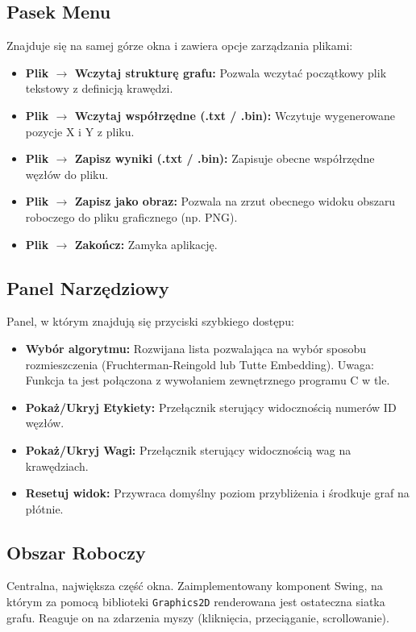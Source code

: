 \documentclass[12pt, a4paper]{article}
\begin{document}
\subsection{Pasek Menu}
Znajduje się na samej górze okna i zawiera opcje zarządzania plikami:
\begin{itemize}
    \item \textbf{Plik $\rightarrow$ Wczytaj strukturę grafu:} Pozwala wczytać początkowy plik tekstowy z definicją krawędzi.
    \item \textbf{Plik $\rightarrow$ Wczytaj współrzędne (.txt / .bin):} Wczytuje wygenerowane pozycje X i Y z pliku.
    \item \textbf{Plik $\rightarrow$ Zapisz wyniki (.txt / .bin):} Zapisuje obecne współrzędne węzłów do pliku.
    \item \textbf{Plik $\rightarrow$ Zapisz jako obraz:} Pozwala na zrzut obecnego widoku obszaru roboczego do pliku graficznego (np. PNG).
    \item \textbf{Plik $\rightarrow$ Zakończ:} Zamyka aplikację.
\end{itemize}

\subsection{Panel Narzędziowy}
Panel, w którym znajdują się przyciski szybkiego dostępu:
\begin{itemize}
    \item \textbf{Wybór algorytmu:} Rozwijana lista pozwalająca na wybór sposobu rozmieszczenia (Fruchterman-Reingold lub Tutte Embedding). Uwaga: Funkcja ta jest połączona z wywołaniem zewnętrznego programu C w tle.
    \item \textbf{Pokaż/Ukryj Etykiety:} Przełącznik sterujący widocznością numerów ID węzłów.
    \item \textbf{Pokaż/Ukryj Wagi:} Przełącznik sterujący widocznością wag na krawędziach.
    \item \textbf{Resetuj widok:} Przywraca domyślny poziom przybliżenia i środkuje graf na płótnie.
\end{itemize}

\subsection{Obszar Roboczy}
Centralna, największa część okna. Zaimplementowany komponent Swing, na którym za pomocą biblioteki \texttt{Graphics2D} renderowana jest ostateczna siatka grafu. Reaguje on na zdarzenia myszy (kliknięcia, przeciąganie, scrollowanie).
\end{document}
